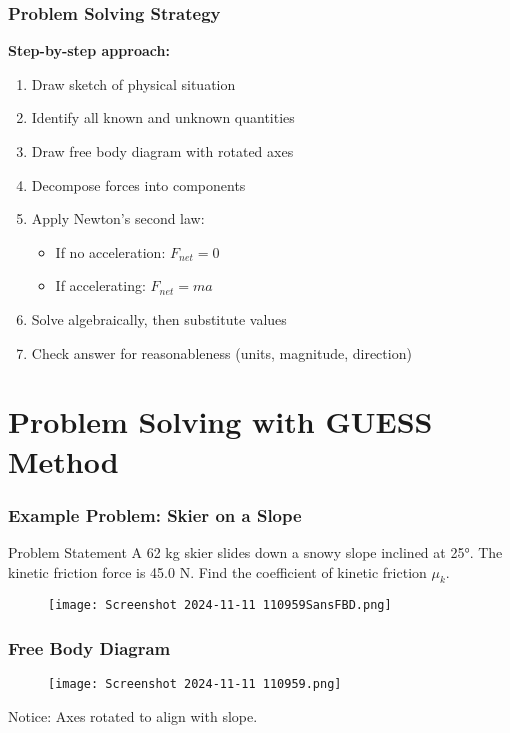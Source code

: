 \documentclass{beamer}
\begin{document}
\begin{frame}
\frametitle{Problem Solving Strategy}
\textbf{Step-by-step approach:}

\begin{enumerate}
    \item Draw sketch of physical situation
    \pause
    \item Identify all known and unknown quantities
    \pause
    \item Draw free body diagram with rotated axes
    \pause
    \item Decompose forces into components
    \pause
    \item Apply Newton's second law:
    \begin{itemize}
        \item If no acceleration: $F_{net} = 0$
        \item If accelerating: $F_{net} = ma$
    \end{itemize}
    \pause
    \item Solve algebraically, then substitute values
    \pause
    \item Check answer for reasonableness (units, magnitude, direction)
\end{enumerate}
\end{frame}

\section{Problem Solving with GUESS Method}

\begin{frame}
\frametitle{Example Problem: Skier on a Slope}
\begin{block}{Problem Statement}
A 62 kg skier slides down a snowy slope inclined at 25°. The kinetic friction force is 45.0 N. Find the coefficient of kinetic friction $\mu_k$.
\end{block}

\begin{figure}[H]
    \centering
    \texttt{[image: Screenshot 2024-11-11 110959SansFBD.png]}
\end{figure}
\end{frame}

\begin{frame}
\frametitle{Free Body Diagram}
\begin{figure}[H]
    \centering
    \texttt{[image: Screenshot 2024-11-11 110959.png]}
\end{figure}

Notice: Axes rotated to align with slope.
\end{frame}
\end{document}
